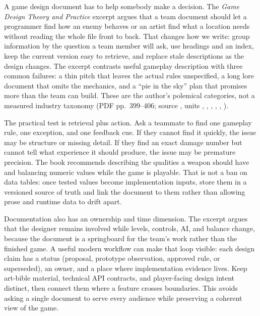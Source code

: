 A game design document has to help somebody make a decision. The \emph{Game Design Theory and Practice} excerpt argues that a team document should let a programmer find how an enemy behaves or an artist find what a location needs without reading the whole file front to back. That changes how we write: group information by the question a team member will ask, use headings and an index, keep the current version easy to retrieve, and replace stale descriptions as the design changes. The excerpt contrasts useful gameplay description with three common failures: a thin pitch that leaves the actual rules unspecified, a long lore document that omits the mechanics, and a ``pie in the sky'' plan that promises more than the team can build. These are the author's polemical categories, not a measured industry taxonomy (PDF pp.~399--406; source , units , , , , , ).

The practical test is retrieval plus action. Ask a teammate to find one gameplay rule, one exception, and one feedback cue. If they cannot find it quickly, the issue may be structure or missing detail. If they find an exact damage number but cannot tell what experience it should produce, the issue may be premature precision. The book recommends describing the qualities a weapon should have and balancing numeric values while the game is playable. That is not a ban on data tables: once tested values become implementation inputs, store them in a versioned source of truth and link the document to them rather than allowing prose and runtime data to drift apart.

Documentation also has an ownership and time dimension. The excerpt argues that the designer remains involved while levels, controls, AI, and balance change, because the document is a springboard for the team's work rather than the finished game. A useful modern workflow can make that loop visible: each design claim has a status (proposal, prototype observation, approved rule, or superseded), an owner, and a place where implementation evidence lives. Keep art-bible material, technical API contracts, and player-facing design intent distinct, then connect them where a feature crosses boundaries. This avoids asking a single document to serve every audience while preserving a coherent view of the game.

